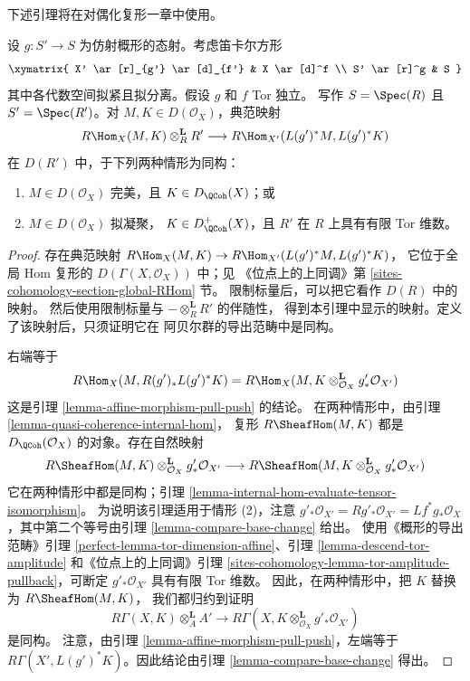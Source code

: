 \noindent
下述引理将在对偶化复形一章中使用。

\begin{lemma}
\label{lemma-affine-morphism-and-hom-out-of-perfect}
设 $g : S' \to S$ 为仿射概形的态射。考虑笛卡尔方形
$$
\xymatrix{
X' \ar[r]_{g'} \ar[d]_{f'} & X \ar[d]^f \\
S' \ar[r]^g & S
}
$$
其中各代数空间拟紧且拟分离。假设 $g$ 和 $f$ Tor 独立。
写作 $S = \Spec(R)$ 且 $S' = \Spec(R')$。对
$M, K \in D(\mathcal{O}_X)$，典范映射
$$
R\Hom_X(M, K) \otimes^\mathbf{L}_R R'
\longrightarrow
R\Hom_{X'}(L(g')^*M, L(g')^*K)
$$
在 $D(R')$ 中，于下列两种情形为同构：
\begin{enumerate}
\item $M \in D(\mathcal{O}_X)$ 完美，且 $K \in D_\QCoh(X)$；或
\item $M \in D(\mathcal{O}_X)$ 拟凝聚，
$K \in D_\QCoh^+(X)$，且 $R'$ 在 $R$ 上具有有限 Tor 维数。
\end{enumerate}
\end{lemma}

\begin{proof}
存在典范映射
$R\Hom_X(M, K) \to R\Hom_{X'}(L(g')^*M, L(g')^*K)$，
它位于全局 Hom 复形的 $D(\Gamma(X, \mathcal{O}_X))$ 中；见
《位点上的上同调》第
\ref{sites-cohomology-section-global-RHom} 节。
限制标量后，可以把它看作 $D(R)$ 中的映射。
然后使用限制标量与 $- \otimes_R^\mathbf{L} R'$ 的伴随性，
得到本引理中显示的映射。定义了该映射后，只须证明它在
阿贝尔群的导出范畴中是同构。

\medskip\noindent
右端等于
$$
R\Hom_X(M, R(g')_*L(g')^*K) =
R\Hom_X(M, K \otimes_{\mathcal{O}_X}^\mathbf{L} g'_*\mathcal{O}_{X'})
$$
这是引理 \ref{lemma-affine-morphism-pull-push} 的结论。
在两种情形中，由引理 \ref{lemma-quasi-coherence-internal-hom}，
复形 $R\SheafHom(M, K)$ 都是
$D_\QCoh(\mathcal{O}_X)$ 的对象。存在自然映射
$$
R\SheafHom(M, K) \otimes_{\mathcal{O}_X}^\mathbf{L} g'_*\mathcal{O}_{X'}
\longrightarrow
R\SheafHom(M, K \otimes_{\mathcal{O}_X}^\mathbf{L} g'_*\mathcal{O}_{X'})
$$
它在两种情形中都是同构；引理
\ref{lemma-internal-hom-evaluate-tensor-isomorphism}。%
为说明该引理适用于情形 (2)，注意
$g'_*\mathcal{O}_{X'} = Rg'_*\mathcal{O}_{X'} =
Lf^*g_*\mathcal{O}_X$，其中第二个等号由引理
\ref{lemma-compare-base-change} 给出。%
使用《概形的导出范畴》引理
\ref{perfect-lemma-tor-dimension-affine}、引理
\ref{lemma-descend-tor-amplitude} 和《位点上的上同调》引理
\ref{sites-cohomology-lemma-tor-amplitude-pullback}，可断定
$g'_*\mathcal{O}_{X'}$ 具有有限 Tor 维数。
因此，在两种情形中，把 $K$ 替换为 $R\SheafHom(M, K)$，
我们都归约到证明
$$
R\Gamma(X, K) \otimes^\mathbf{L}_A A' \longrightarrow
R\Gamma(X, K \otimes^\mathbf{L}_{\mathcal{O}_X} g'_*\mathcal{O}_{X'})
$$
是同构。%
注意，由引理 \ref{lemma-affine-morphism-pull-push}，左端等于
$R\Gamma(X', L(g')^*K)$。因此结论由引理
\ref{lemma-compare-base-change} 得出。
\end{proof}

